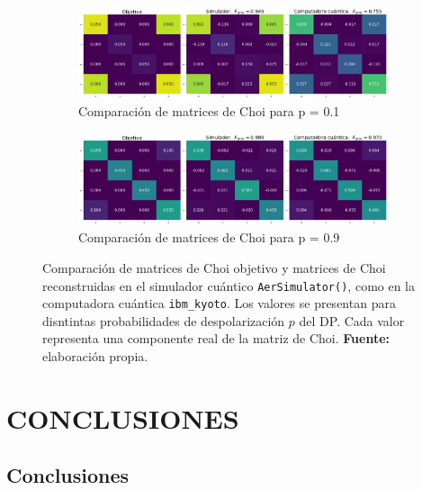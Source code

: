 \documentclass[letterpaper,12pt]{thesisECFM}
\theoremstyle{plain}
\theoremstyle{definition}
\theoremstyle{definition}
\theoremstyle{remark}
\newcommand{\1}{\mathbb{1}}
\begin{document}
\begin{figure}[h!] %
    \centering
    \begin{subfigure}{\textwidth}
        \centering
        \includegraphics[width=1\linewidth]{imagenes/comp_choi_p0.1.png}
        \caption{Comparación de matrices de Choi para p = 0.1}
        \label{fig:choi_p0.1}
    \end{subfigure}
    \vspace{1em} %
    
    \begin{subfigure}{\textwidth}
        \centering
        \includegraphics[width=1\linewidth]{imagenes/comp_choi_p0.9.png}
        \caption{Comparación de matrices de Choi para p = 0.9}
        \label{fig:choi_p0.9}
    \end{subfigure}
    
    \caption[Comparación de matrices de Choi objetivo y
reconstruidas]{
    Comparación de matrices de Choi objetivo y matrices de Choi reconstruidas en el simulador cuántico \texttt{AerSimulator()}, como en la computadora cuántica \texttt{ibm\_kyoto}. Los valores se presentan para disntintas probabilidades de despolarización $p$ del DP. Cada valor representa una componente real de la matriz de Choi. \textbf{Fuente:} elaboración propia.}
    \label{fig:comparacion_choi}
\end{figure} %

\chapter{CONCLUSIONES} %
\section{Conclusiones}
\end{document}
